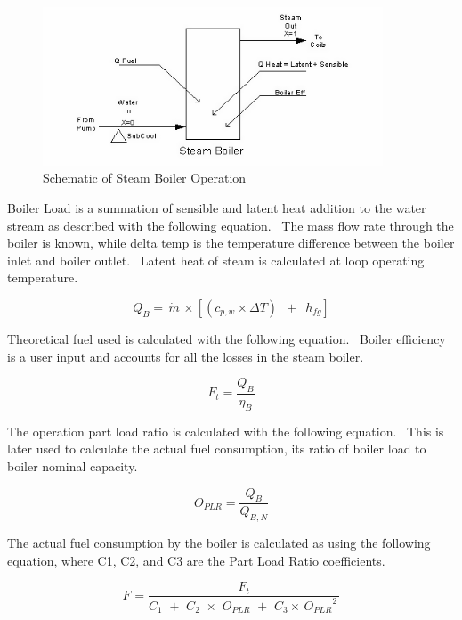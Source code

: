 \begin{figure}[hbtp] %
\centering
\includegraphics[width=0.9\textwidth, height=0.9\textheight, keepaspectratio=true]{media/image2933.png}
\caption{Schematic of Steam Boiler Operation \protect \label{fig:schematic-of-steam-boiler-operation}}
\end{figure}

Boiler Load is a summation of sensible and latent heat addition to the water stream as described with the following equation.~ The mass flow rate through the boiler is known, while delta temp is the temperature difference between the boiler inlet and boiler outlet.~ Latent heat of steam is calculated at loop operating temperature.

\begin{equation}
{Q_B} = \,\dot m\, \times \left[ {({c_{p,w}} \times \Delta T)\,\,\, + \,\,\,{h_{fg}}} \right]
\end{equation}

Theoretical fuel used is calculated with the following equation.~ Boiler efficiency is a user input and accounts for all the losses in the steam boiler.

\begin{equation}
{F_t} = \frac{{{Q_B}}}{{{\eta_B}}}
\end{equation}

The operation part load ratio is calculated with the following equation.~ This is later used to calculate the actual fuel consumption, its ratio of boiler load to boiler nominal capacity.

\begin{equation}
{O_{PLR}} = \frac{{{Q_B}}}{{{Q_{B,N}}}}
\end{equation}

The actual fuel consumption by the boiler is calculated as using the following equation, where C1, C2, and C3 are the Part Load Ratio coefficients.

\begin{equation}
{F_{}} = \frac{{{F_t}}}{{{C_1}\,\, + \,\,{C_2}\,\, \times \,\,{O_{PLR}}\,\, + \,\,{C_3} \times \,{O_{PLR}}^2\,}}
\end{equation}

